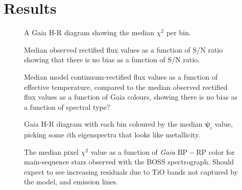 \documentclass[modern]{aastex631}
\newcommand{\project}[1]{\textit{#1}}
\newcommand{\vectheta}{\boldsymbol{\theta}}
\newcommand{\vecpsi}{\boldsymbol{\psi}}
\newcommand{\vecW}{\mathbf{W}}
\newcommand{\vecH}{\mathbf{H}}
\newcommand{\vecX}{\mathbf{X}}
\newcommand{\apogee}{\project{APOGEE}}
\newcommand{\boss}{\project{BOSS}}
\newcommand{\todo}[1]{\textcolor{tab:blue}{#1}}
\begin{document}

\section{Results}\label{sec:results}

\begin{figure}
    \caption{A Gaia H-R diagram showing the median $\chi^2$ per bin.}
\end{figure}

\begin{figure}
    \caption{Median observed rectified flux values as a function of S/N ratio showing that there is no bias as a function of S/N ratio.}
\end{figure}


\begin{figure}
    \caption{Median model continuum-rectified flux values as a function of effective temperature, compared to the median observed rectified flux values as a function of Gaia colours, showing there is no bias as a function of spectral type?}
\end{figure}


\begin{figure}
    \caption{Gaia H-R diagram with each bin coloured by the median $\vecpsi_i$ value, picking some $i$th eigenspectra that looks like metallicity. \label{fig:gaia_hrd_metallicity}}
\end{figure}


\begin{figure*}
    \caption{The median pixel $\chi^2$ value as a function of \emph{Gaia} $\mathrm{BP} - \mathrm{RP}$ color for main-sequence stars observed with the BOSS spectrograph. \todo{Should expect to see increasing residuals due to TiO bands not captured by the model, and emission lines.}}
\end{figure*}
\end{document}

